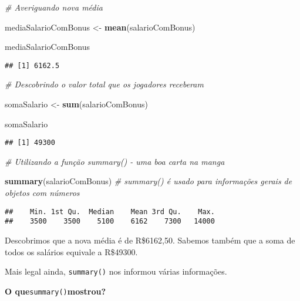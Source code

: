 \documentclass[
]{article}
\newenvironment{Shaded}{\begin{snugshade}}{\end{snugshade}}
\newcommand{\CommentTok}[1]{\textcolor[rgb]{0.56,0.35,0.01}{\textit{#1}}}
\newcommand{\KeywordTok}[1]{\textcolor[rgb]{0.13,0.29,0.53}{\textbf{#1}}}
\newcommand{\NormalTok}[1]{#1}
\newcommand{\StringTok}[1]{\textcolor[rgb]{0.31,0.60,0.02}{#1}}
\begin{document}
\begin{Shaded}
\begin{Highlighting}[]
\CommentTok{# Averiguando nova média}

\NormalTok{mediaSalarioComBonus <-}\StringTok{ }\KeywordTok{mean}\NormalTok{(salarioComBonus)}

\NormalTok{mediaSalarioComBonus}
\end{Highlighting}
\end{Shaded}

\begin{verbatim}
## [1] 6162.5
\end{verbatim}

\begin{Shaded}
\begin{Highlighting}[]
\CommentTok{# Descobrindo o valor total que os jogadores receberam}

\NormalTok{somaSalario <-}\StringTok{ }\KeywordTok{sum}\NormalTok{(salarioComBonus)}

\NormalTok{somaSalario}
\end{Highlighting}
\end{Shaded}

\begin{verbatim}
## [1] 49300
\end{verbatim}

\begin{Shaded}
\begin{Highlighting}[]
\CommentTok{# Utilizando a função summary() - uma boa carta na manga}

\KeywordTok{summary}\NormalTok{(salarioComBonus) }\CommentTok{# summary() é usado para informações gerais de objetos com números}
\end{Highlighting}
\end{Shaded}

\begin{verbatim}
##    Min. 1st Qu.  Median    Mean 3rd Qu.    Max. 
##    3500    3500    5100    6162    7300   14000
\end{verbatim}

Descobrimos que a nova média é de R\$6162,50. Sabemos também que a soma
de todos os salários equivale a R\$49300.

Mais legal ainda, \texttt{summary()} nos informou várias informações.

\textbf{O que}\texttt{summary()}\textbf{mostrou?}
\end{document}
